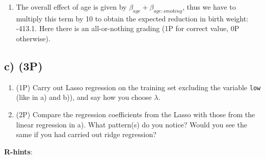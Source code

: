 \documentclass[
]{article}
\newenvironment{Shaded}{\begin{snugshade}}{\end{snugshade}}
\newcommand{\AttributeTok}[1]{\textcolor[rgb]{0.77,0.63,0.00}{#1}}
\newcommand{\DecValTok}[1]{\textcolor[rgb]{0.00,0.00,0.81}{#1}}
\newcommand{\FunctionTok}[1]{\textcolor[rgb]{0.00,0.00,0.00}{#1}}
\newcommand{\NormalTok}[1]{#1}
\newcommand{\OtherTok}[1]{\textcolor[rgb]{0.56,0.35,0.01}{#1}}
\newcommand{\SpecialCharTok}[1]{\textcolor[rgb]{0.00,0.00,0.00}{#1}}
\providecommand{\tightlist}{%
  \setlength{\itemsep}{0pt}\setlength{\parskip}{0pt}}
\begin{document}
\begin{enumerate}
\def\labelenumi{(\roman{enumi})}
\setcounter{enumi}{1}
\tightlist
\item
  The overall effect of age is given by
  \(\beta_{age} + \beta_{age:smoking}\), thus we have to multiply this
  term by 10 to obtain the expected reduction in birth weight: -413.1.
  Here there is an all-or-nothing grading (1P for correct value, 0P
  otherwise).
\end{enumerate}

\hypertarget{c-3p}{%
\subsection{c) (3P)}\label{c-3p}}

\begin{enumerate}
\def\labelenumi{(\roman{enumi})}
\tightlist
\item
  (1P) Carry out Lasso regression on the training set excluding the
  variable \texttt{low} (like in a) and b)), and say how you choose
  \(\lambda\).
\item
  (2P) Compare the regression coefficients from the Lasso with those
  from the linear regression in a). What pattern(s) do you notice? Would
  you see the same if you had carried out ridge regression?
\end{enumerate}

\textbf{R-hints}:

\begin{Shaded}
\end{Shaded}

\begin{Shaded}
\end{Shaded}
\end{document}
